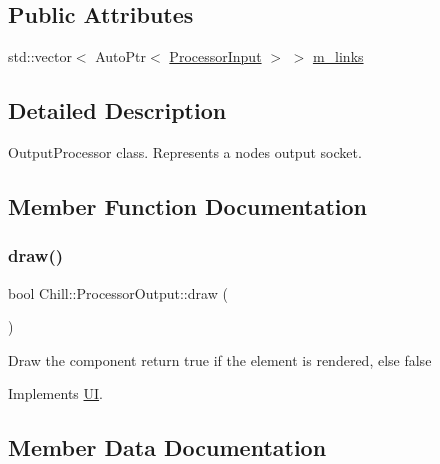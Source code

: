 \subsection*{Public Attributes}
\begin{DoxyCompactItemize}
\item 
std\+::vector$<$ Auto\+Ptr$<$ \mbox{\hyperlink{class_chill_1_1_processor_input}{Processor\+Input}} $>$ $>$ \mbox{\hyperlink{class_chill_1_1_processor_output_a538e5f1c81f00df42d8bbd6500e51dae}{m\+\_\+links}}
\end{DoxyCompactItemize}


\subsection{Detailed Description}
Output\+Processor class. Represents a node\textquotesingle{}s output socket. 

\subsection{Member Function Documentation}
\mbox{\label{class_chill_1_1_processor_output_ae9d397902ac6fcd1fa09fff1cc9231c0}} 
\subsubsection{\texorpdfstring{draw()}{draw()}}
{\footnotesize\ttfamily bool Chill\+::\+Processor\+Output\+::draw (\begin{DoxyParamCaption}{ }\end{DoxyParamCaption})\hspace{0.3cm}{\ttfamily [virtual]}}

Draw the component return true if the element is rendered, else false 

Implements \mbox{\hyperlink{class_u_i_a5025b88e26f21852c0cd2e4b42675c50}{UI}}.



\subsection{Member Data Documentation}
\mbox{\label{class_chill_1_1_processor_output_a538e5f1c81f00df42d8bbd6500e51dae}} 
